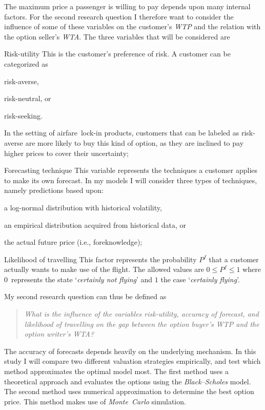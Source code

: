 The maximum price a passenger is willing to pay depends upon many internal factors. For the second research question I therefore want to consider the influence of some of these variables on the customer's \emph{WTP} and the relation with the option seller's \emph{WTA}. The three variables that will be considered are
\begin{compactdesc}
\item[Risk-utility] This is the customer's preference of risk. A customer can be categorized as \begin{inparaenum}
\item risk-averse,
\item risk-neutral, or
\item risk-seeking.
\end{inparaenum} In the setting of airfare~lock-in products, customers that can be labeled as risk-averse are more likely to buy this kind of option, as they are inclined to pay higher prices to cover their uncertainty;
\item[Forecasting technique] This variable represents the techniques a customer applies to make its own forecast. In my models I will consider three types of techniques, namely predictions based upon: \begin{inparaenum}
\item a log-normal distribution with historical volatility,
\item an empirical distribution acquired from historical data, or
\item the actual future price (i.e., foreknowledge);
\end{inparaenum}
\item[Likelihood of travelling] This factor represents the probability $P^f$ that a customer actually wants to make use of the flight. The allowed values are $0 \le P^f \le 1$ where $0$~represents the state `\emph{certainly not flying}' and $1$ the case  `\emph{certainly flying}'.
\vspace{1em}
\end{compactdesc}

\noindent
My second research question can thus be defined as
\begin{quote}\emph{What is the influence of the variables risk-utility, accuracy of forecast, and likelihood of travelling on the gap between the option buyer's WTP and the option writer's WTA?}\end{quote}

The accuracy of forecasts depends heavily on the underlying mechanism. In this study I will compare two different valuation strategies empirically, and test which meth\-od ap\-prox\-i\-mates the optimal model most. The first method uses a theoretical approach and evaluates the options using the \emph{Black--Scholes} model. The second method uses numerical approximation to determine the best option price. This method makes use of \emph{Monte~Carlo} simulation.

